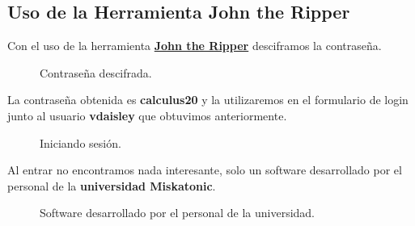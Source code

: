 \documentclass[a4paper]{article} %
\begin{document}
    \subsection{Uso de la Herramienta John the Ripper}
    
    \vspace{0.2cm}

    Con el uso de la herramienta \href{https://www.kali.org/tools/john}{\textbf{\color{black}John the Ripper}} desciframos la contraseña.

    \begin{figure}[h] %
        \begin{center}
        \setlength{\fboxsep}{0.2em} %
        \end{center}
        \captionsetup{labelfont=bf} %
        \caption{Contraseña descifrada.}
    \end{figure}

    \vspace{9cm}

    La contraseña obtenida es \textbf{calculus20} y la utilizaremos en el formulario de login junto al usuario \textbf{vdaisley} que obtuvimos anteriormente.

    \begin{figure}[h] %
        \begin{center}
        \setlength{\fboxsep}{0.2em} %
        \end{center}
        \captionsetup{labelfont=bf} %
        \caption{Iniciando sesión.}
    \end{figure}

    Al entrar no encontramos nada interesante, solo un software desarrollado por el personal de la \textbf{universidad Miskatonic}.

    \begin{figure}[h] %
        \begin{center}
        \setlength{\fboxsep}{0.2em} %
        \end{center}
        \captionsetup{labelfont=bf} %
        \caption{Software desarrollado por el personal de la universidad.}
    \end{figure}
\end{document}
